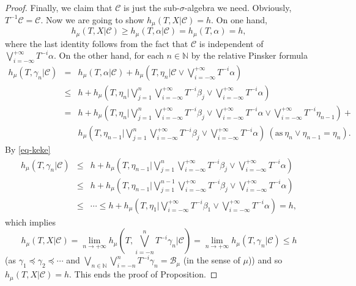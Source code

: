 \documentclass[12pt]{amsart}
\theoremstyle{definition} \theoremstyle{question}
\numberwithin{equation}{section}
\begin{document}
\begin{proof}
Finally, we claim that $\mathcal{C}$ is just the
sub-$\sigma$-algebra we need. Obviously, $T^{- 1} \mathcal{C}=
\mathcal{C}$. Now we are going to show $h_\mu (T, X| \mathcal{C})=
h$. On one hand,
$$h_\mu (T, X| \mathcal{C})\ge h_\mu (T, \alpha| \mathcal{C})=
h_\mu (T, \alpha)= h,$$
where the last identity follows from the fact
 that $\mathcal{C}$ is independent of $\bigvee_{i= - \infty}^{+
 \infty}
T^{- i} \alpha$. On the other hand, for each $n\in \mathbb{N}$ by
the relative Pinsker formula
\begin{eqnarray*}
h_\mu (T, \gamma_n| \mathcal{C})&= & h_\mu (T, \alpha| \mathcal{C})+
h_\mu (T, \eta_n| \mathcal{C}\vee \bigvee_{i= - \infty}^{+
\infty} T^{- i} \alpha) \\
&\le & h+ h_\mu (T, \eta_n| \bigvee_{j= 1}^n \bigvee_{i= -
\infty}^{+ \infty} T^{- i} \beta_j\vee
\bigvee_{i= - \infty}^{+ \infty} T^{- i} \alpha) \\
&= & h+ h_\mu (T, \eta_{n}| \bigvee_{j= 1}^n \bigvee_{i= -
\infty}^{+ \infty} T^{- i} \beta_j\vee \bigvee_{i= - \infty}^{+
\infty} T^{- i} \alpha\vee \bigvee_{i= - \infty}^{+ \infty} T^{- i}
\eta_{n- 1})+ \\
& & h_\mu (T, \eta_{n- 1}| \bigvee_{j= 1}^n \bigvee_{i= - \infty}^{+
\infty} T^{- i} \beta_j\vee \bigvee_{i= - \infty}^{+ \infty} T^{- i}
\alpha)\ (\text{as}\ \eta_n\vee \eta_{n- 1}= \eta_n).
\end{eqnarray*}
By \eqref{eq-keke}
\begin{eqnarray*}
h_\mu (T, \gamma_n| \mathcal{C})&\le & h+ h_\mu (T, \eta_{n- 1}|
\bigvee_{j= 1}^n \bigvee_{i= - \infty}^{+ \infty} T^{- i}
\beta_j\vee \bigvee_{i= - \infty}^{+ \infty} T^{- i} \alpha)\
 \\
&\le & h+ h_\mu (T, \eta_{n- 1}| \bigvee_{j= 1}^{n- 1} \bigvee_{i= -
\infty}^{+ \infty} T^{- i} \beta_j\vee
\bigvee_{i= - \infty}^{+ \infty} T^{- i} \alpha) \\
&\le & \cdots\le h+ h_\mu (T, \eta_1| \bigvee_{i= -
\infty}^{+ \infty} T^{- i} \beta_1\vee
\bigvee_{i= - \infty}^{+ \infty} T^{- i} \alpha)= h,
\end{eqnarray*}
which implies
$$h_\mu (T, X| \mathcal{C})= \lim_{n\rightarrow +\infty}
h_\mu (T, \bigvee_{i= - n}^n T^{- i} \gamma_n| \mathcal{C})=
\lim_{n\rightarrow +\infty} h_\mu (T, \gamma_n| \mathcal{C})\le h$$
(as $\gamma_1\preceq \gamma_2\preceq \cdots$ and $\bigvee_{n\in
\mathbb{N}} \bigvee_{i= - n}^n T^{- i} \gamma_n= \mathcal{B}_\mu$ (in the
sense of $\mu$)) and so $h_\mu (T, X| \mathcal{C})= h$. This ends the
proof of Proposition.
\end{proof}
\end{document}

